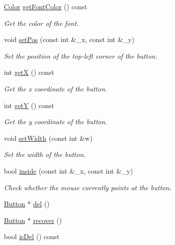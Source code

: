 \begin{DoxyCompactItemize}
\mbox{\hyperlink{class_color}{Color}} \mbox{\hyperlink{class_button_a2e0b249c69141b3c88c797015b2464c6}{get\+Font\+Color}} () const
\begin{DoxyCompactList}\small\item\em Get the color of the font. \end{DoxyCompactList}\item 
void \mbox{\hyperlink{class_button_a2a68b92dff42182822d4be189fc3cca6}{set\+Pos}} (const int \&\+\_\+x, const int \&\+\_\+y)
\begin{DoxyCompactList}\small\item\em Set the position of the top-\/left corner of the button. \end{DoxyCompactList}\item 
int \mbox{\hyperlink{class_button_a05c6aae1cf037ad66e3821963fe72988}{getX}} () const
\begin{DoxyCompactList}\small\item\em Get the x coordinate of the button. \end{DoxyCompactList}\item 
int \mbox{\hyperlink{class_button_a3acf216100c43b999e38047bfdf99ee7}{getY}} () const
\begin{DoxyCompactList}\small\item\em Get the y coordinate of the button. \end{DoxyCompactList}\item 
void \mbox{\hyperlink{class_button_a0ffdc53b6e8abd2de78cdd2ab40d2d69}{set\+Width}} (const int \&w)
\begin{DoxyCompactList}\small\item\em Set the width of the button. \end{DoxyCompactList}\item 
bool \mbox{\hyperlink{class_button_ad7ac1018e71492e734ec0eae2d800d24}{inside}} (const int \&\+\_\+x, const int \&\+\_\+y)
\begin{DoxyCompactList}\small\item\em Check whether the mouse currently points at the button. \end{DoxyCompactList}\item 
\mbox{\hyperlink{class_button}{Button}} $\ast$ \mbox{\hyperlink{class_button_a83d4a76946aa8896173c010e5846f74c}{del}} ()
\item 
\mbox{\hyperlink{class_button}{Button}} $\ast$ \mbox{\hyperlink{class_button_a769460b65574008ad93b2a7a9bbc0673}{recover}} ()
\item 
bool \mbox{\hyperlink{class_button_a8926913ae57165ae3ee4b1496509895e}{is\+Del}} () const
\end{DoxyCompactItemize}


